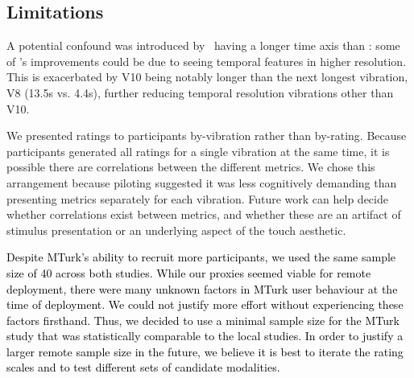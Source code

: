     
    
    
    
    \subsection{Limitations}
    
    A potential confound was introduced by \linear\ having a longer time axis than \original: some of \linear's improvements could be due to seeing temporal features in higher resolution.
    This is exacerbated by V10 being notably longer than the next longest vibration, V8 (13.5s vs. 4.4s), further reducing temporal resolution vibrations other than V10.
    
    We presented ratings to participants by-vibration rather than by-rating.
    Because participants generated all ratings for a single vibration at the same time, it is possible there are correlations between the different metrics.
    We chose this arrangement because piloting suggested it was less cognitively demanding than presenting metrics separately for each vibration.
    Future work can help decide whether correlations exist between metrics, and whether these are an artifact of stimulus presentation or an underlying aspect of the touch aesthetic.
    
    \textcolor{black}{Despite MTurk's ability to recruit more participants, we used the same sample size of 40 across both studies. While our proxies seemed viable for remote deployment, there were many unknown factors in MTurk user behaviour at the time of deployment. We could not justify more effort without experiencing these factors firsthand. Thus, we decided to use a minimal sample size for the MTurk study that was statistically comparable to the local studies. In order to justify a larger remote sample size in the future, we believe it is best to iterate the rating scales and to test different sets of candidate modalities.}
    
